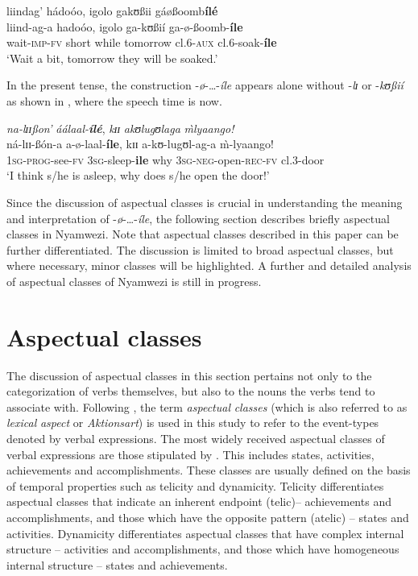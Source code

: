 \documentclass[output=paper,newtxmath,modfonts,nonflat,draftmode]{langsci/langscibook}
\begin{document}
\ea \label{ex:kanijo:6}
\glll liindag’        hádoóo,      igolo         gakʊßii   gáøßoomb\textbf{ílé}\\
liind-ag-a     hadoóo,      igolo         ga-kʊßií  ga-ø-ßoomb-\textbf{íle}\\
wait-\textsc{imp}-\textsc{fv} short while tomorrow cl.6-\textsc{aux} cl.6-soak-\textbf{íle}\\
\glt ‘Wait a bit, tomorrow they will be soaked.’
\z


In the present tense, the construction -\textit{ø}-\ldots-\textit{íle} appears alone without -\textit{l}{\textit{ɪ}} or -\textit{kʊßií} as shown in , where the speech time is now. 

\ea \label{ex:kanijo:7}
\glll \textit{na-lɪɪ}\textit{ßon’}           \textit{áálaal-}\textbf{\textit{ílé}},    \textit{k}{\textit{ɪɪ}} \textit{akʊ}\textit{lugʊlaga}              \textit{\`{m}lyaango!}\\
ná-lɪɪ-ßón-a           a-ø-laal-\textbf{íle},   kɪɪ  a-kʊ-lugʊl-ag-a            \`{m}-lyaango!\\
\textsc{1sg}-\textsc{prog}-see-\textsc{fv} \textsc{3sg}-sleep-\textbf{ile} why \textsc{3sg}-\textsc{neg}-open-\textsc{rec}-\textsc{fv} cl.3-door\\
\glt ‘I think s/he is asleep, why does s/he open the door!’
\z

Since the discussion of aspectual classes is crucial in understanding the meaning and interpretation of -\textit{ø}-…-\textit{íle}, the following section describes briefly aspectual classes in Nyamwezi. Note that aspectual classes described in this paper can be further differentiated. The discussion is limited to broad aspectual classes, but where necessary, minor classes will be highlighted. A further and detailed analysis of aspectual classes of Nyamwezi is still in progress. 


\section{Aspectual classes}
\label{sec:kanijo:3}

The discussion of aspectual classes in this section pertains not only to the categorization of verbs themselves, but also to the nouns the verbs tend to associate with. Following \citet[1]{Rothstein2004}, the term \textit{aspectual} \textit{classes} (which is also referred to as \textit{lexical} \textit{aspect} or \textit{Aktionsart}) is used in this study to refer to the event-types denoted by verbal expressions. The most widely received aspectual classes of verbal expressions are those stipulated by \citet{Vendler1957}. This includes states, activities, achievements and accomplishments. These classes are usually defined on the basis of temporal properties such as telicity and dynamicity. Telicity differentiates aspectual classes that indicate an inherent endpoint (telic)-- achievements and accomplishments, and those which have the opposite pattern (atelic) -- states and activities. Dynamicity differentiates aspectual classes that have complex internal structure -- activities and accomplishments, and those which have homogeneous internal structure -- states and achievements.
\end{document}
